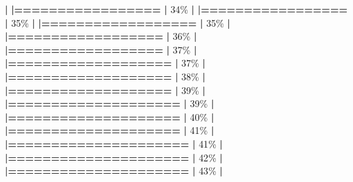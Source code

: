 \documentclass[
]{book}
\newenvironment{Shaded}{\begin{snugshade}}{\end{snugshade}}
\newcommand{\DecValTok}[1]{\textcolor[rgb]{0.00,0.00,0.81}{#1}}
\newcommand{\ErrorTok}[1]{\textcolor[rgb]{0.64,0.00,0.00}{\textbf{#1}}}
\newcommand{\NormalTok}[1]{#1}
\newcommand{\SpecialCharTok}[1]{\textcolor[rgb]{0.81,0.36,0.00}{\textbf{#1}}}
\begin{document}
\begin{Shaded}
\begin{Highlighting}[]
  \SpecialCharTok{|}                                                        
  \ErrorTok{|=================}                                 \ErrorTok{|}  \DecValTok{34}\NormalTok{\%}
  \SpecialCharTok{|}                                                        
  \ErrorTok{|=================}                                 \ErrorTok{|}  \DecValTok{35}\NormalTok{\%}
  \SpecialCharTok{|}                                                        
  \ErrorTok{|==================}                                \ErrorTok{|}  \DecValTok{35}\NormalTok{\%}
  \SpecialCharTok{|}                                                        
  \ErrorTok{|==================}                                \ErrorTok{|}  \DecValTok{36}\NormalTok{\%}
  \SpecialCharTok{|}                                                        
  \ErrorTok{|==================}                                \ErrorTok{|}  \DecValTok{37}\NormalTok{\%}
  \SpecialCharTok{|}                                                        
  \ErrorTok{|===================}                               \ErrorTok{|}  \DecValTok{37}\NormalTok{\%}
  \SpecialCharTok{|}                                                        
  \ErrorTok{|===================}                               \ErrorTok{|}  \DecValTok{38}\NormalTok{\%}
  \SpecialCharTok{|}                                                        
  \ErrorTok{|===================}                               \ErrorTok{|}  \DecValTok{39}\NormalTok{\%}
  \SpecialCharTok{|}                                                        
  \ErrorTok{|====================}                              \ErrorTok{|}  \DecValTok{39}\NormalTok{\%}
  \SpecialCharTok{|}                                                        
  \ErrorTok{|====================}                              \ErrorTok{|}  \DecValTok{40}\NormalTok{\%}
  \SpecialCharTok{|}                                                        
  \ErrorTok{|====================}                              \ErrorTok{|}  \DecValTok{41}\NormalTok{\%}
  \SpecialCharTok{|}                                                        
  \ErrorTok{|=====================}                             \ErrorTok{|}  \DecValTok{41}\NormalTok{\%}
  \SpecialCharTok{|}                                                        
  \ErrorTok{|=====================}                             \ErrorTok{|}  \DecValTok{42}\NormalTok{\%}
  \SpecialCharTok{|}                                                        
  \ErrorTok{|=====================}                             \ErrorTok{|}  \DecValTok{43}\NormalTok{\%}
  \SpecialCharTok{|}                                                        

\end{Highlighting}
\end{Shaded}
\end{document}
